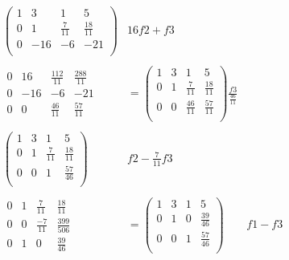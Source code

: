 \[
  \begin{aligned}
    \left(
        \begin{array}{ccc|c}
            1 & 3 & 1 & 5 \\
            0 & 1 & \frac{7}{11} & \frac{18}{11} \\
            0 & -16 & -6 & -21 \\
        \end{array}
    \right)
    & 16f2+f3 \\ \\
    \begin{array}{ccc|c}
        0 & 16 & \frac{112}{11} & \frac{288}{11} \\
        0 & -16 & -6 & -21 \\
        \hline
        0 & 0 & \frac{46}{11} & \frac{57}{11}
    \end{array}
    & =
    \left(
        \begin{array}{ccc|c}
            1 & 3 & 1 & 5 \\
            0 & 1 & \frac{7}{11} & \frac{18}{11} \\
            0 & 0 & \frac{46}{11} & \frac{57}{11} \\
        \end{array}
    \right)
    \frac{f3}{\frac{46}{11}} \\ \\
    \left(
        \begin{array}{ccc|c}
            1 & 3 & 1 & 5 \\
            0 & 1 & \frac{7}{11} & \frac{18}{11} \\
            0 & 0 & 1 & \frac{57}{46} \\
        \end{array}
    \right)
    & f2-\frac{7}{11}f3 \\ \\
    \begin{array}{ccc|c}
        0 & 1 & \frac{7}{11} & \frac{18}{11} \\
        0 & 0 & \frac{-7}{11} & \frac{399}{506} \\
        \hline
        0 & 1 & 0 & \frac{39}{46}
    \end{array}
    & =
    \left(
        \begin{array}{ccc|c}
            1 & 3 & 1 & 5 \\
            0 & 1 & 0 & \frac{39}{46} \\
            0 & 0 & 1 & \frac{57}{46} \\
        \end{array}
    \right)
    & f1-f3 \\ \\
  \end{aligned}  
\]

